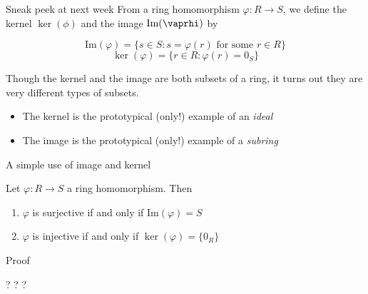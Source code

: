 \documentclass{beamer}
\begin{document}
\begin{frame}{Sneak peek at next week}
  From a ring homomorphism $\varphi:R\to S$, we define the kernel $\ker(\phi)$ and the image $\text{Im}(\vaprhi)$ by

  $$\text{Im}(\varphi)=\{s\in S : s=\varphi(r) \text{ for some } r\in R\}$$
    $$\ker(\varphi)=\{r\in R : \varphi(r)=0_S\}$$
  

Though the kernel and the image are both subsets of a ring, it turns out they are very different types of subsets.

\begin{itemize}
\item The kernel is the prototypical (only!) example of an \emph{ideal}
  \item The image is the prototypical (only!) example of a \emph{subring}
\end{itemize}
\end{frame}


\begin{frame}{A simple use of image and kernel}


  \begin{lemma} Let $\varphi:R\to S$ a ring homomorphism.  Then

    \begin{enumerate}
    \item $\varphi$ is surjective if and only if $\text{Im}(\varphi)=S$
      \item $\varphi$ is injective if and only if $\ker(\varphi)=\{0_R\}$
      \end{enumerate}
\end{lemma}

\begin{block}{Proof}
\begin{center} ? ? ? \end{center}
\end{block}  
  \end{frame}
\end{document}
